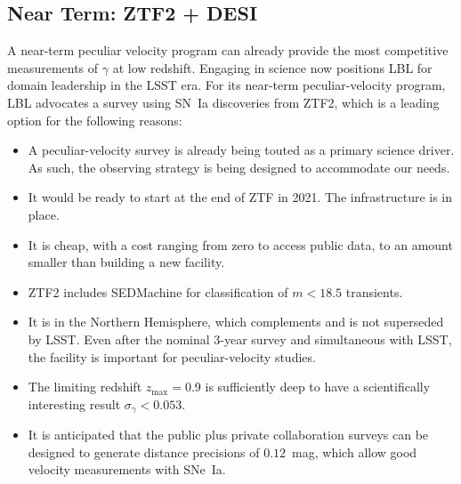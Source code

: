 \documentclass[11pt, oneside]{article}   	%
\begin{document}
\subsection{Near Term: ZTF2 + DESI}
A near-term peculiar velocity program can already provide the most competitive measurements of $\gamma$ at low redshift.  Engaging in science
now positions LBL for domain leadership in the LSST era.  For its near-term peculiar-velocity program, LBL advocates a survey using SN~Ia discoveries from ZTF2,
which is a leading option for the following reasons:
\begin{itemize}
\item A peculiar-velocity survey is already being touted as a primary science driver. As such,
the observing strategy is being designed to accommodate our needs.
\item It would be ready to start at the end of ZTF in 2021.   The infrastructure is in place.
\item It is cheap, with a cost ranging from zero to access public data, to an amount smaller
than building a new facility.
\item ZTF2 includes SEDMachine for classification of $m<18.5$ transients.
\item It is in the Northern Hemisphere, which complements and is not superseded by LSST. 
Even after the nominal 3-year survey and simultaneous with LSST, the facility is important for peculiar-velocity studies.
\item The limiting redshift $z_{\text{max}} =0.9$ is sufficiently deep  to have a scientifically interesting result $\sigma_\gamma < 0.053$.
\item It is anticipated that the public plus private collaboration surveys can be designed to generate distance
precisions of $0.12$~mag, which allow good velocity measurements with SNe~Ia.
\end{itemize}
\end{document}
